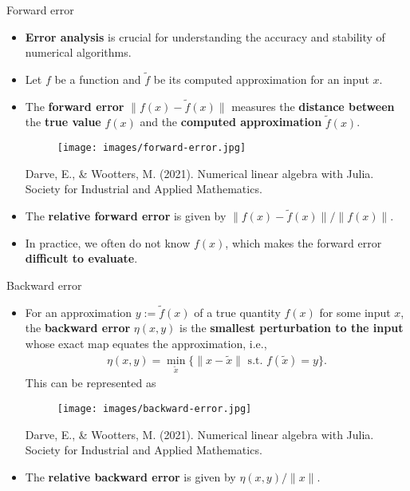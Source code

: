 \documentclass[t,usepdftitle=false]{beamer}
\begin{document}
\begin{frame}{Forward error}
\begin{itemize}
\item \textbf{Error analysis} is crucial for understanding the accuracy and stability of numerical algorithms.
\item Let $f$ be a function and $\tilde{f}$ be its computed approximation for an input $x$.
\item The \textbf{forward error} $\|f(x) - \tilde{f}(x)\|$ measures the \textbf{distance between} the \textbf{true value} $f(x)$ and the \textbf{computed approximation} $\tilde{f}(x)$.
\begin{figure}
\texttt{[image: images/forward-error.jpg]}
\end{figure}
\tiny{Darve, E., \& Wootters, M. (2021). Numerical linear algebra with Julia. Society for Industrial and Applied Mathematics.}\\
\normalsize
\item The \textbf{relative forward error} is given by $\|f(x) - \tilde{f}(x)\|/\|f(x)\|$.
\item In practice, we often do not know $f(x)$, which makes the forward error \textbf{difficult to evaluate}.
\end{itemize}
\vfill
\end{frame}

\begin{frame}{Backward error}
\begin{itemize}
\item For an approximation $y:=\tilde{f}(x)$ of a true quantity $f(x)$ for some input $x$, the \textbf{backward error} $\eta(x,y)$ is the \textbf{smallest perturbation to the input} whose exact map equates the approximation, i.e.,
\begin{align*}
\eta(x,y)=\underset{\tilde{x}}{\min}\{\|x-\tilde{x}\|\text{ s.t. }f(\tilde{x})=y\}.
\end{align*}
This can be represented as
\begin{figure}
\texttt{[image: images/backward-error.jpg]}
\end{figure}
\tiny{Darve, E., \& Wootters, M. (2021). Numerical linear algebra with Julia. Society for Industrial and Applied Mathematics.}\\
\normalsize
\item The \textbf{relative backward error} is given by $\eta(x,y)/\|x\|$.
\end{itemize}
\end{frame}
\end{document}
